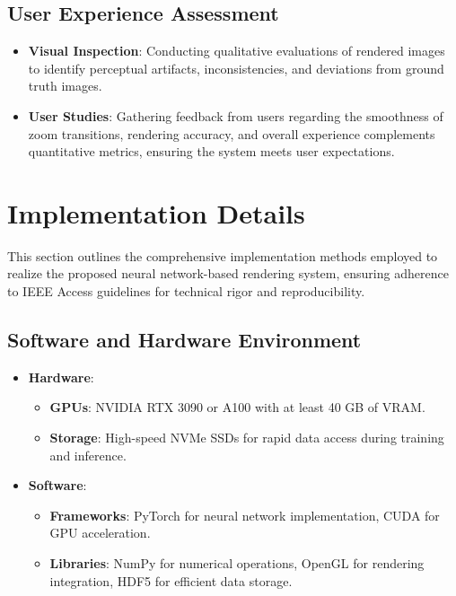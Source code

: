 \documentclass[journal]{IEEEaccess}
\begin{document}
\subsection{User Experience Assessment}
\begin{itemize}
    \item \textbf{Visual Inspection}: Conducting qualitative evaluations of rendered images to identify perceptual artifacts, inconsistencies, and deviations from ground truth images.
    
    \item \textbf{User Studies}: Gathering feedback from users regarding the smoothness of zoom transitions, rendering accuracy, and overall experience complements quantitative metrics, ensuring the system meets user expectations.
\end{itemize}

\section{Implementation Details}
\label{sec:implementation_details}
This section outlines the comprehensive implementation methods employed to realize the proposed neural network-based rendering system, ensuring adherence to IEEE Access guidelines for technical rigor and reproducibility.

\subsection{Software and Hardware Environment}
\begin{itemize}
    \item \textbf{Hardware}:
    \begin{itemize}
        \item \textbf{GPUs}: NVIDIA RTX 3090 or A100 with at least 40 GB of VRAM.
        \item \textbf{Storage}: High-speed NVMe SSDs for rapid data access during training and inference.
    \end{itemize}
    
    \item \textbf{Software}:
    \begin{itemize}
        \item \textbf{Frameworks}: PyTorch for neural network implementation, CUDA for GPU acceleration.
        \item \textbf{Libraries}: NumPy for numerical operations, OpenGL for rendering integration, HDF5 for efficient data storage.
    \end{itemize}
\end{itemize}
\end{document}
